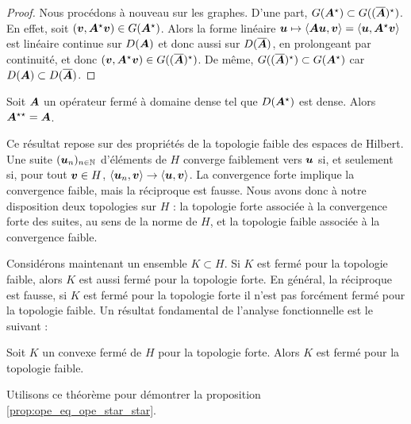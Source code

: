 \begin{proof}
	\begin{sloppypar}
	Nous procédons à nouveau sur les graphes.
	D'une part, $G(\bm{A}^\star) \subset G((\overline{\bm{A}})^\star)$.
	En effet, soit $(\bm{v} , \bm{A}^\star \bm{v}) \in G(\bm{A}^\star)$.
	Alors la forme linéaire $\bm{u} \mapsto
	\left\langle \bm{A} \bm{u} , \bm{v} \right\rangle =
	\left\langle \bm{u} , \bm{A}^\star \bm{v} \right\rangle$
	est linéaire continue sur $D(\bm{A})$ et donc aussi sur $D(\overline{\bm{A}})$,
	en prolongeant par continuité, et donc
	$(\bm{v} , \bm{A}^\star \bm{v}) \in G((\overline{\bm{A}})^\star)$.
	De même, $G((\overline{\bm{A}})^\star) \subset G(\bm{A}^\star)$
	car $D(\bm{A}) \subset D(\overline{\bm{A}})$.
	\end{sloppypar}
\end{proof}

\begin{proposition} \label{prop:ope_eq_ope_star_star}
	Soit $\bm{A}$ un opérateur fermé à domaine dense tel que $D(\bm{A}^\star)$
	est dense. Alors $\bm{A}^{\star \star} = \bm{A}$.
\end{proposition}

Ce résultat repose sur des propriétés de la topologie faible des espaces
de Hilbert. Une suite $(\bm{u}_n)_{n \in \mathbb{N}}$ d'éléments de $H$
converge faiblement vers $\bm{u}$ si, et seulement si, pour tout $\bm{v} \in H$,
$\left\langle \bm{u}_n , \bm{v} \right\rangle \rightarrow
\left\langle \bm{u} , \bm{v} \right\rangle$.
La convergence forte implique la convergence faible,
mais la réciproque est fausse.
Nous avons donc à notre disposition deux topologies sur $H$ :
la topologie forte associée à la convergence forte des suites,
au sens de la norme de $H$,
et la topologie faible associée à la convergence faible.

Considérons maintenant un ensemble $K \subset H$.
Si $K$ est fermé pour la topologie faible, alors $K$ est aussi fermé
pour la topologie forte.
En général, la réciproque est fausse, si $K$ est fermé pour la topologie
forte il n'est pas forcément fermé pour la topologie faible.
Un résultat fondamental de l'analyse fonctionnelle est le suivant :

\begin{theorem}
	Soit $K$ un convexe fermé de $H$ pour la topologie forte.
	Alors $K$ est fermé pour la topologie faible.
\end{theorem}

Utilisons ce théorème pour démontrer la proposition
\ref{prop:ope_eq_ope_star_star}.

